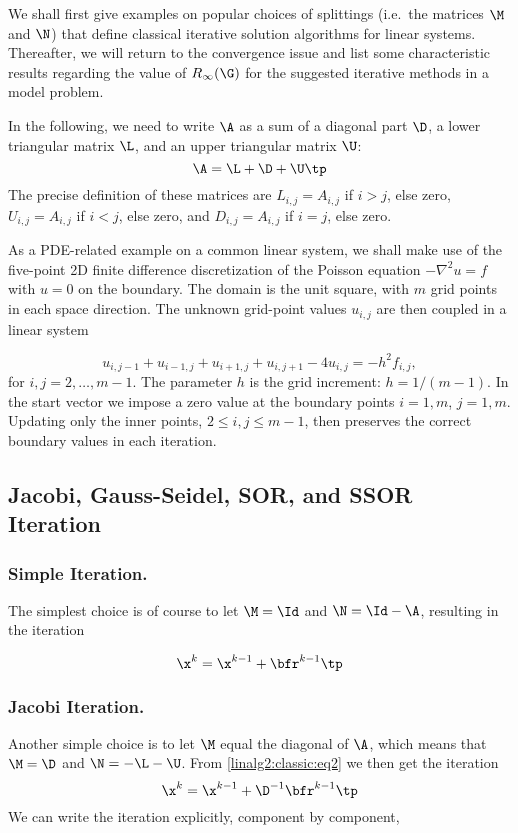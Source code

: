 We shall first give examples on popular choices of splittings
(i.e.~the matrices $\M$ and $\N$) that define classical iterative solution
algorithms for linear systems. Thereafter, we will return to
the convergence issue and list some characteristic results
regarding the value of $R_{\infty}(\G )$ for the suggested iterative methods
in a model problem.

In the following, we  need to write $\A$ as a sum of a diagonal part
$\D$, a lower triangular matrix $\L$, and an upper triangular
matrix $\U$:
\[ \A = \L + \D + \U \tp \]
The precise definition of these matrices are
$L_{i,j} =A_{i,j}$ if $i>j$, else zero,
$U_{i,j} = A_{i,j}$ if $i<j$, else zero, and
$D_{i,j} = A_{i,j}$ if $i=j$, else zero.

As a PDE-related example on a common linear system, we shall make use of
the five-point 2D finite difference discretization of the Poisson
equation $-\nabla^2 u =f$ with $u=0$ on the boundary. The domain is
the unit square, with $m$ grid points in each space direction.
The unknown grid-point values $u_{i,j}$ are then coupled in a linear
system

\begin{equation}
u_{i,j-1} + u_{i-1,j} + u_{i+1,j} + u_{i,j+1} -4u_{i,j} = -h^2f_{i,j},
\label{linalg2:classic:umodel}
\end{equation}
for $i,j=2,\ldots,m-1$.
The parameter $h$
is the grid increment: $h=1/(m-1)$.
In the start vector we impose a zero value at
the boundary points $i=1,m$, $j=1,m$.
Updating only the inner points, $2\leq i,j\leq m-1$, then preserves
the correct boundary values in each iteration.

\subsection{Jacobi, Gauss-Seidel, SOR, and SSOR Iteration}


\subsubsection{Simple Iteration.} The simplest choice is of course to
let $\M =\Id$ and $\N = \Id -\A$, resulting in the iteration

\begin{equation}
\x^{k} = \x^{k-1} + \bfr^{k-1} \tp
\label{linalg2:classic:Rich1}
\end{equation}

\subsubsection{Jacobi Iteration.}
Another simple choice is to let
$\M$ equal the diagonal of $\A$, which means that $\M =\D$ and
$\N =-\L -\U$. From \eqref{linalg2:classic:eq2} we then get the
iteration
\begin{equation}
\x^{k} = \x^{k-1} + \D^{-1}\bfr^{k-1} \tp
\label{linalg2:classic:Jacobi1}
\end{equation}
We can write the iteration explicitly, component by component,

